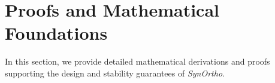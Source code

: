 \documentclass{article}
\theoremstyle{plain}
\theoremstyle{definition}
\theoremstyle{remark}
\begin{document}



\newpage
\appendix
\onecolumn

\section{Proofs and Mathematical Foundations}
\label{appendix-proofs}

In this section, we provide detailed mathematical derivations and proofs supporting the design and stability guarantees of \textit{SynOrtho}.
\end{document}
